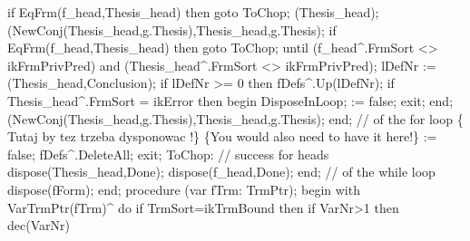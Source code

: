             if EqFrm(f_head,Thesis_head) then goto ToChop;
            (Thesis_head);
            (NewConj(Thesis_head,g.Thesis),Thesis_head,g.Thesis);
            if EqFrm(f_head,Thesis_head) then goto ToChop;
         until (f_head^.FrmSort <> ikFrmPrivPred) and (Thesis_head^.FrmSort <> ikFrmPrivPred);
         lDefNr :=  (Thesis_head,Conclusion);
         if lDefNr >= 0 then fDefs^.Up(lDefNr);
         if Thesis_head^.FrmSort = ikError then
         begin DisposeInLoop;  := false; exit; end;
         (NewConj(Thesis_head,g.Thesis),Thesis_head,g.Thesis);
      end; // of the for loop
      \{ Tutaj by tez trzeba dysponowac !\} \{You would also need to have it here!\}
       := false; fDefs^.DeleteAll; exit;
      ToChop: // success for heads
         dispose(Thesis_head,Done);
      dispose(f_head,Done);
   end; // of the while loop
   dispose(fForm);
end;
\eatline
{}\nwendcode{}\nwdocspar
\nwenddocs{}\endmoddef\nwstartdeflinemarkup{}\nwenddeflinemarkup
procedure (var fTrm: TrmPtr);
begin
  with VarTrmPtr(fTrm)^ do
     if TrmSort=ikTrmBound then
        if VarNr>1 then dec(VarNr)
